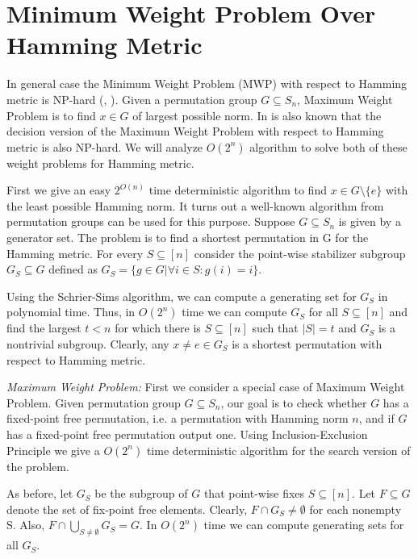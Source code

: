 \documentclass[12pt]{report}
\begin{document}
\newpage


\section{Minimum Weight Problem Over Hamming Metric}

\indent \par In general case the Minimum Weight Problem (MWP) with respect to Hamming metric
is NP-hard (\cite{Arvind}, \cite{Cameron}). Given a permutation group $G \subseteq S_n$, Maximum Weight Problem is to
find $x \in G$ of largest possible norm. In is also known that the decision version of the Maximum Weight Problem with respect to Hamming metric is also NP-hard. We will analyze $O(2^n)$ algorithm to solve both of these weight problems for Hamming metric.

First we give an easy $2^{O(n)}$ time deterministic algorithm to find $x \in G \setminus \{e\}$  with the least possible Hamming norm. It turns out a well-known algorithm from permutation groups can be used for this purpose. Suppose $G \subseteq S_n$ is given by a generator set. The problem is to find a shortest permutation in G for the Hamming metric. For every $S \subseteq [n]$ consider the point-wise stabilizer subgroup $G_S \subseteq G$ defined as $G_S = \{g \in G | \forall i \in S: g(i) = i\}$.

Using the Schrier-Sims algorithm, we can compute a generating set for $G_S$ in polynomial time. Thus, in $O(2^n)$ time we can compute $G_S$ for all $S \subseteq [n]$ and find the largest $t < n$ for which there is $S\subseteq [n]$ such that $|S| = t$ and $G_S$ is a nontrivial subgroup. Clearly, any $x \neq e \in G_S$ is a shortest permutation with respect to Hamming metric.

\textit{Maximum Weight Problem:} First we consider a special case of Maximum Weight
Problem. Given permutation group $G \subseteq S_n$, our goal is to check whether $G$ has a fixed-point free permutation, i.e. a permutation with Hamming norm $n$, and if $G$ has a fixed-point free permutation output one. Using Inclusion-Exclusion Principle we give a $O(2^n)$ time deterministic algorithm for the search version of the problem.

As before, let $G_S$ be the subgroup of $G$ that point-wise fixes $S\subseteq [n]$. Let $F \subseteq G$ denote the set of fix-point free elements. Clearly, $F \cap G_S \neq \emptyset$ for each nonempty S. Also, $F \cap  \bigcup_{S \neq \emptyset} G_S = G$. In $O(2^n)$ time we can compute generating sets for all $G_S$.
\end{document}

